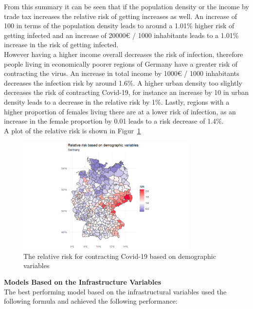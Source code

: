 From this summary it can be seen that if the population density or the income by trade tax increases the relative risk of getting increases as well. An increase of 100 in terms of the population density leads to around a 1.01\% higher risk of getting infected and an increase of 20000€ / 1000 inhabitants leads to a 1.01\% increase in the risk of getting infected. \\
However having a higher income overall decreases the risk of infection, therefore people living in economically poorer regions of Germany have a greater risk of contracting the virus. An increase in total income by 1000€ / 1000 inhabitants decreases the infection risk by around 1.6\%. A higher urban density too slightly decreases the risk of contracting Covid-19, for instance an increase by 10 in urban density leads to a decrease in the relative risk by 1\%. Lastly, regions with a higher proportion of females living there are at a lower risk of infection, as an increase in the female proportion by 0.01 leads to a risk decrease of 1.4\%. \\
A plot of the relative risk is shown in Figur~\ref{relriskDemoGermany}
%     
\begin{figure}[H]
    \centering
    \includegraphics[width = 0.8\textwidth]{tex_files/demo_germany.png}
    \caption{The relative risk for contracting Covid-19 based on demographic variables}
    \label{relriskDemoGermany}
\end{figure}
\textbf{Models Based on the Infrastructure Variables} \\
The best performing model based on the infrastructural variables used the following formula and achieved the following performance:
